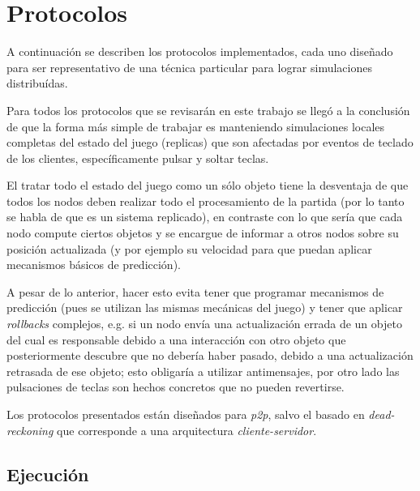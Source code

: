 \section{Protocolos}





A continuación se describen los protocolos implementados, cada uno diseñado para ser representativo de una técnica particular para lograr simulaciones distribuídas.

Para todos los protocolos que se revisarán en este trabajo se llegó a la conclusión de que la forma más simple de trabajar es manteniendo simulaciones locales completas del estado del juego (replicas) que son afectadas por eventos de teclado de los clientes, específicamente pulsar y soltar teclas.

El tratar todo el estado del juego como un sólo objeto tiene la desventaja de que todos los nodos deben realizar todo el procesamiento de la partida (por lo tanto se habla de que es un sistema replicado), en contraste con lo que sería que cada nodo compute ciertos objetos y se encargue de informar a otros nodos sobre su posición actualizada (y por ejemplo su velocidad para que puedan aplicar mecanismos básicos de predicción).

A pesar de lo anterior, hacer esto evita tener que programar mecanismos de predicción (pues se utilizan las mismas mecánicas del juego) y tener que aplicar \emph{rollbacks} complejos, e.g. si un nodo envía una actualización errada de un objeto del cual es responsable debido a una interacción con otro objeto que posteriormente descubre que no debería haber pasado, debido a una actualización retrasada de ese objeto; esto obligaría a utilizar antimensajes, por otro lado las pulsaciones de teclas son hechos concretos que no pueden revertirse.

Los protocolos presentados están diseñados para \emph{p2p}, salvo el basado en \emph{dead-reckoning} que corresponde a una arquitectura \emph{cliente-servidor}.

\subsection{Ejecución}

